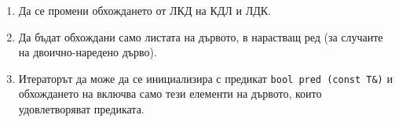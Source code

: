 \documentclass[12pt,a4paper]{article}
\begin{document}
\begin{enumerate}
	\begin{enumerate}
		\item Да се промени обхождането от ЛКД на КДЛ и ЛДК.
		\item Да бъдат обхождани само листата на дървото, в нарастващ ред (за случаите на двоично-наредено дърво).
		\item Итераторът да може да се инициализира с предикат \texttt{bool pred (const T\&)} и обхождането на включва само тези елементи на дървото, които удовлетворяват предиката.

	\end{enumerate}





\end{enumerate}
\end{document}
